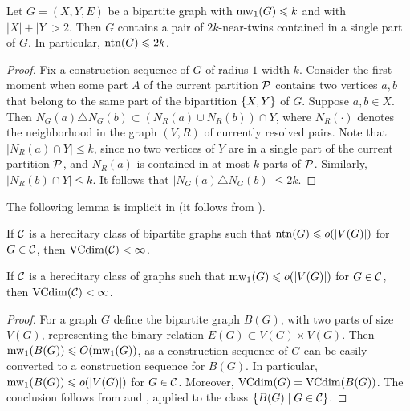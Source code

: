 \begin{lemma}\label{lem:twins-bip}
    Let $G=(X,Y,E)$ be a bipartite graph with $\mw_1(G)\le k$
    and with $|X|+|Y|>2$.
    Then $G$ contains a pair of $2k$-near-twins
     contained in a single part of $G$. In particular, $\ntn(G)\le 2k$.
\end{lemma}
\begin{proof}
    Fix a construction sequence of $G$ of radius-$1$ width $k$. Consider the first moment when some part $A$ of the current partition $\cal P$ contains two vertices $a,b$ that belong to the same part of the bipartition $\set{X,Y}$ of $G$. Suppose $a,b\in X$. Then $N_G(a)\triangle N_G(b)\subset (N_R(a)\cup N_R(b))\cap Y$,
    where $N_R(\cdot)$ denotes the neighborhood in the graph $(V,R)$  of currently resolved pairs.
    Note that $|N_R(a)\cap Y|\le k$,
    since no two vertices of $Y$ are in a single part of the current partition $\cal P$, and $N_R(a)$ is contained in at most $k$ parts of $\cal P$. Similarly, $|N_R(b)\cap Y|\le k$.
    It follows that $|N_G(a)\triangle N_G(b)|\le 2k$.
\end{proof}

The following lemma is implicit in \cite{flip-width}
(it follows from 
\cite[Lem. 5.25]{flip-width-arxiv}).
\begin{lemma}\label{lem:ntn}
    If $\CC$ is a hereditary class of bipartite graphs such that $\ntn(G)\le o(|V(G)|)$ for $G \in \CC$, then $\VCdim(\CC)<\infty$.
\end{lemma}





\begin{corollary}\label{lem:abmw-vc}
    If $\CC$ is a hereditary class of graphs such that $\mw_1(G)\le o(|V(G)|)$ for $G \in \CC$, then $\VCdim(\CC)<\infty$.
\end{corollary}
    \begin{proof}
For a graph $G$ define the bipartite graph $B(G)$, with two parts of size $V(G)$,
representing the binary relation $E(G)\subset V(G)\times V(G)$.
Then $\mw_1(B(G))\le O (\mw_1(G))$, as a construction sequence of $G$ can
be easily converted to a construction sequence for $B(G)$.
In particular, $\mw_1(B(G))\le o(|V(G)|)$ for $G\in \CC$.
Moreover, $\VCdim(G)=\VCdim(B(G))$.
The conclusion follows from 
and , applied to the class $\setof{B(G)}{G\in\CC}$.
    \end{proof}




